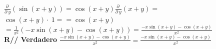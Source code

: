 \documentclass[14pt]{memoir}
\begin{document}
\begin{enumerate}
$\frac{\partial \:}{\partial \:y}\left(\sin \left(x+y\right)\right) =\cos \left(x+y\right)\frac{\partial \:}{\partial \:y}\left(x+y\right) =$\\
$\cos \left(x+y\right)\cdot \:1 = =\cos \left(x+y\right)$\\

$=\frac{1}{x^2}\left(-x\sin \left(x+y\right)-\cos \left(x+y\right)\right) = \frac{-x\sin \left(x+y\right)-\cos \left(x+y\right)}{x^2}$\\


\textbf{ R// Verdadero} $\frac{-x\sin \left(x+y\right)-\cos \left(x+y\right)}{x^2} =  \frac{-x\sin \left(x+y\right)-\cos \left(x+y\right)}{x^2}$\\


 

\end{enumerate}	
\end{document}
